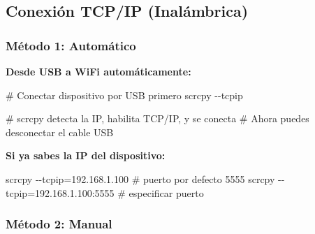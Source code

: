 \documentclass[
  doc,
  floatsintext,
  longtable,
  a4paper,
  nolmodern,
  notxfonts,
  notimes,
  12pt,
  colorlinks=true,linkcolor=blue,citecolor=blue,urlcolor=blue]{apa7}
\newenvironment{Shaded}{\begin{snugshade}}{\end{snugshade}}
\newcommand{\AttributeTok}[1]{\textcolor[rgb]{0.40,0.45,0.13}{#1}}
\newcommand{\CommentTok}[1]{\textcolor[rgb]{0.37,0.37,0.37}{#1}}
\newcommand{\ExtensionTok}[1]{\textcolor[rgb]{0.00,0.23,0.31}{#1}}
\newcommand{\FunctionTok}[1]{\textcolor[rgb]{0.28,0.35,0.67}{#1}}
\newcommand{\KeywordTok}[1]{\textcolor[rgb]{0.00,0.23,0.31}{\textbf{#1}}}
\newcommand{\NormalTok}[1]{\textcolor[rgb]{0.00,0.23,0.31}{#1}}
\newcommand{\OperatorTok}[1]{\textcolor[rgb]{0.37,0.37,0.37}{#1}}
\newcommand{\StringTok}[1]{\textcolor[rgb]{0.13,0.47,0.30}{#1}}
\begin{document}
\subsection{Conexión TCP/IP
(Inalámbrica)}\label{conexiuxf3n-tcpip-inaluxe1mbrica}

\subsubsection{Método 1: Automático}\label{muxe9todo-1-automuxe1tico}

\textbf{Desde USB a WiFi automáticamente:}

\begin{Shaded}
\begin{Highlighting}[]
\CommentTok{\# Conectar dispositivo por USB primero}
\ExtensionTok{scrcpy} \AttributeTok{{-}{-}tcpip}

\CommentTok{\# scrcpy detecta la IP, habilita TCP/IP, y se conecta}
\CommentTok{\# Ahora puedes desconectar el cable USB}
\end{Highlighting}
\end{Shaded}

\textbf{Si ya sabes la IP del dispositivo:}

\begin{Shaded}
\begin{Highlighting}[]
\ExtensionTok{scrcpy} \AttributeTok{{-}{-}tcpip}\OperatorTok{=}\NormalTok{192.168.1.100       }\CommentTok{\# puerto por defecto 5555}
\ExtensionTok{scrcpy} \AttributeTok{{-}{-}tcpip}\OperatorTok{=}\NormalTok{192.168.1.100:5555  }\CommentTok{\# especificar puerto}
\end{Highlighting}
\end{Shaded}

\subsubsection{Método 2: Manual}\label{muxe9todo-2-manual}

\begin{Shaded}
\end{Shaded}
\end{document}
